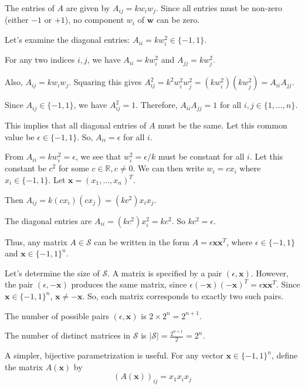 \documentclass[12pt,a4paper]{article}
\theoremstyle{definition}
\begin{document}
        The entries of $A$ are given by $A_{ij} = k w_i w_j$. Since all entries must be non-zero (either $-1$ or $+1$), no component $w_i$ of $\mathbf{w}$ can be zero.

        Let's examine the diagonal entries: $A_{ii} = k w_i^2 \in \{-1, 1\}$.

        For any two indices $i, j$, we have $A_{ii} = k w_i^2$ and $A_{jj} = k w_j^2$.

        Also, $A_{ij} = k w_i w_j$. Squaring this gives $A_{ij}^2 = k^2 w_i^2 w_j^2 = (k w_i^2)(k w_j^2) = A_{ii} A_{jj}$.

        Since $A_{ij} \in \{-1, 1\}$, we have $A_{ij}^2 = 1$. Therefore, $A_{ii} A_{jj} = 1$ for all $i, j \in \{1, \dots, n\}$.

        This implies that all diagonal entries of $A$ must be the same. Let this common value be $\epsilon \in \{-1, 1\}$. So, $A_{ii} = \epsilon$ for all $i$.

        From $A_{ii} = k w_i^2 = \epsilon$, we see that $w_i^2 = \epsilon/k$ must be constant for all $i$. Let this constant be $c^2$ for some $c \in \mathbb{R}, c \neq 0$. We can then write $w_i = c x_i$ where $x_i \in \{-1, 1\}$. Let $\mathbf{x} = (x_1, \dots, x_n)^T$.

        Then $A_{ij} = k (c x_i)(c x_j) = (k c^2) x_i x_j$.

        The diagonal entries are $A_{ii} = (k c^2) x_i^2 = k c^2$. So $k c^2 = \epsilon$.

        Thus, any matrix $A \in \mathcal{S}$ can be written in the form $A = \epsilon \mathbf{x}\mathbf{x}^T$, where $\epsilon \in \{-1, 1\}$ and $\mathbf{x} \in \{-1, 1\}^n$.

        Let's determine the size of $\mathcal{S}$. A matrix is specified by a pair $(\epsilon, \mathbf{x})$. However, the pair $(\epsilon, -\mathbf{x})$ produces the same matrix, since $\epsilon(-\mathbf{x})(-\mathbf{x})^T = \epsilon \mathbf{x}\mathbf{x}^T$. Since $\mathbf{x} \in \{-1, 1\}^n$, $\mathbf{x} \neq -\mathbf{x}$. So, each matrix corresponds to exactly two such pairs.

        The number of possible pairs $(\epsilon, \mathbf{x})$ is $2 \times 2^n = 2^{n+1}$.

        The number of distinct matrices in $\mathcal{S}$ is $|\mathcal{S}| = \frac{2^{n+1}}{2} = 2^n$.

        A simpler, bijective parametrization is useful. For any vector $\mathbf{x} \in \{-1, 1\}^n$, define the matrix $A(\mathbf{x})$ by
        $$(A(\mathbf{x}))_{ij} = x_1 x_i x_j$$
\end{document}

